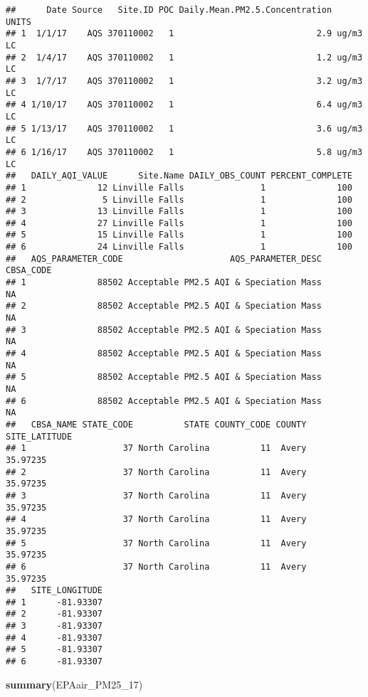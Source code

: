 \documentclass[]{article}
\newenvironment{Shaded}{\begin{snugshade}}{\end{snugshade}}
\newcommand{\KeywordTok}[1]{\textcolor[rgb]{0.13,0.29,0.53}{\textbf{#1}}}
\newcommand{\DecValTok}[1]{\textcolor[rgb]{0.00,0.00,0.81}{#1}}
\newcommand{\NormalTok}[1]{#1}
\begin{document}
\begin{verbatim}
##      Date Source   Site.ID POC Daily.Mean.PM2.5.Concentration    UNITS
## 1  1/1/17    AQS 370110002   1                            2.9 ug/m3 LC
## 2  1/4/17    AQS 370110002   1                            1.2 ug/m3 LC
## 3  1/7/17    AQS 370110002   1                            3.2 ug/m3 LC
## 4 1/10/17    AQS 370110002   1                            6.4 ug/m3 LC
## 5 1/13/17    AQS 370110002   1                            3.6 ug/m3 LC
## 6 1/16/17    AQS 370110002   1                            5.8 ug/m3 LC
##   DAILY_AQI_VALUE      Site.Name DAILY_OBS_COUNT PERCENT_COMPLETE
## 1              12 Linville Falls               1              100
## 2               5 Linville Falls               1              100
## 3              13 Linville Falls               1              100
## 4              27 Linville Falls               1              100
## 5              15 Linville Falls               1              100
## 6              24 Linville Falls               1              100
##   AQS_PARAMETER_CODE                     AQS_PARAMETER_DESC CBSA_CODE
## 1              88502 Acceptable PM2.5 AQI & Speciation Mass        NA
## 2              88502 Acceptable PM2.5 AQI & Speciation Mass        NA
## 3              88502 Acceptable PM2.5 AQI & Speciation Mass        NA
## 4              88502 Acceptable PM2.5 AQI & Speciation Mass        NA
## 5              88502 Acceptable PM2.5 AQI & Speciation Mass        NA
## 6              88502 Acceptable PM2.5 AQI & Speciation Mass        NA
##   CBSA_NAME STATE_CODE          STATE COUNTY_CODE COUNTY SITE_LATITUDE
## 1                   37 North Carolina          11  Avery      35.97235
## 2                   37 North Carolina          11  Avery      35.97235
## 3                   37 North Carolina          11  Avery      35.97235
## 4                   37 North Carolina          11  Avery      35.97235
## 5                   37 North Carolina          11  Avery      35.97235
## 6                   37 North Carolina          11  Avery      35.97235
##   SITE_LONGITUDE
## 1      -81.93307
## 2      -81.93307
## 3      -81.93307
## 4      -81.93307
## 5      -81.93307
## 6      -81.93307
\end{verbatim}

\begin{Shaded}
\begin{Highlighting}[]
\KeywordTok{summary}\NormalTok{(EPAair_PM25_}\DecValTok{17}\NormalTok{)}
\end{Highlighting}
\end{Shaded}
\end{document}
